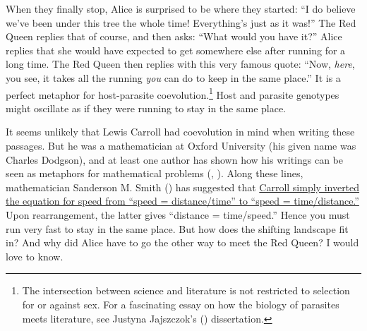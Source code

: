 \documentclass[
  letterpaper,
]{book}
\begin{document}
When they finally stop, Alice is surprised to be where they started: ``I
do believe we've been under this tree the whole time! Everything's just
as it was!'' The Red Queen replies that of course, and then asks: ``What
would you have it?'' Alice replies that she would have expected to get
somewhere else after running for a long time. The Red Queen then replies
with this very famous quote: ``Now, \emph{here}, you see, it takes all
the running \emph{you} can do to keep in the same place.'' It is a
perfect metaphor for host-parasite coevolution.\footnote{The
  intersection between science and literature is not restricted to
  selection for or against sex. For a fascinating essay on how the
  biology of parasites meets literature, see Justyna Jajszczok's
  () dissertation.} Host and parasite
genotypes might oscillate as if they were running to stay in the same
place.

It seems unlikely that Lewis Carroll had coevolution in mind when
writing these passages. But he was a mathematician at Oxford University
(his given name was Charles Dodgson), and at least one author has shown
how his writings can be seen as metaphors for mathematical problems
(,
). Along these lines, mathematician
Sanderson M. Smith () has suggested that
\href{http://www.herkimershideaway.org/writings/carroll.htm}{Carroll
simply inverted the equation for speed from ``speed = distance/time'' to
``speed = time/distance.''} Upon rearrangement, the latter gives
``distance = time/speed.'' Hence you must run very fast to stay in the
same place. But how does the shifting landscape fit in? And why did
Alice have to go the other way to meet the Red Queen? I would love to
know.
\end{document}
